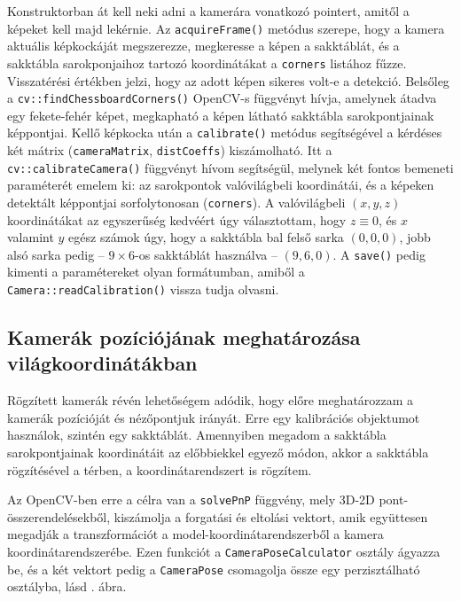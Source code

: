 Konstruktorban át kell neki adni a kamerára vonatkozó pointert, amitől a képeket kell majd lekérnie. Az \texttt{acquireFrame()} metódus szerepe, hogy a kamera aktuális képkockáját megszerezze, megkeresse a képen a sakktáblát, és a sakktábla sarokponjaihoz tartozó koordinátákat a \texttt{corners} listához fűzze. Visszatérési értékben jelzi, hogy az adott képen sikeres volt-e a detekció. Belsőleg a \texttt{cv::findChessboardCorners()} OpenCV-s függvényt hívja, amelynek átadva egy fekete-fehér képet, megkapható a képen látható sakktábla sarokpontjainak képpontjai. Kellő képkocka után a \texttt{calibrate()} metódus segítségével a kérdéses két mátrix (\texttt{cameraMatrix}, \texttt{distCoeffs}) kiszámolható. Itt a \texttt{cv::calibrateCamera()} függvényt hívom segítségül, melynek két fontos bemeneti paraméterét emelem ki: az sarokpontok valóvilágbeli koordinátái, és a képeken detektált képpontjai sorfolytonosan (\texttt{corners}). A valóvilágbeli $(x, y, z)$ koordinátákat az egyszerűség kedvéért úgy választottam, hogy $z \equiv 0$, és $x$ valamint $y$ egész számok úgy, hogy a sakktábla bal felső sarka $(0, 0, 0)$, jobb alsó sarka pedig -- $9\times 6$-os sakktáblát használva -- $(9, 6, 0)$. A \texttt{save()} pedig kimenti a paramétereket olyan formátumban, amiből a \texttt{Camera::readCalibration()} vissza tudja olvasni.


\subsection{Kamerák pozíciójának meghatározása világkoordinátákban}


Rögzített kamerák révén lehetőségem adódik, hogy előre meghatározzam a kamerák pozícióját és nézőpontjuk irányát. Erre egy kalibrációs objektumot használok, szintén egy sakktáblát. Amennyiben megadom a sakktábla sarokpontjainak koordinátáit az előbbiekkel egyező módon, akkor a sakktábla rögzítésével a térben, a koordinátarendszert is rögzítem. 

Az OpenCV-ben erre a célra van a \texttt{solvePnP} függvény, mely 3D-2D pont-összerendelésekből, kiszámolja a forgatási és eltolási vektort, amik együttesen megadják a transzformációt a model-koordinátarendszerből a kamera koordinátarendszerébe. Ezen funkciót a \texttt{CameraPoseCalculator} osztály ágyazza be, és a két vektort pedig a \texttt{CameraPose} csomagolja össze egy perzisztálható osztályba, lásd . ábra.

